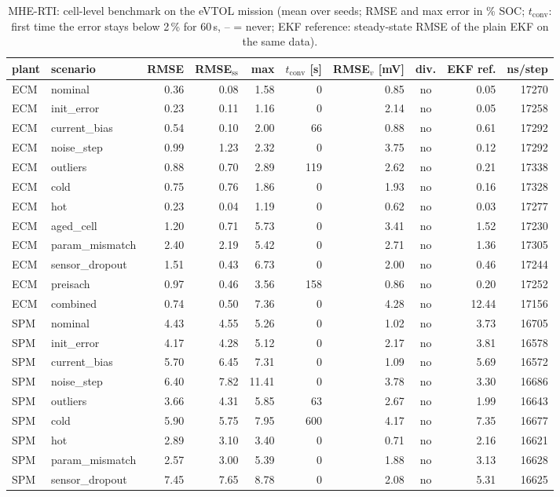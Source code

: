 \begin{table}[H]\centering\footnotesize\setlength{\tabcolsep}{4pt}
\caption{MHE-RTI: cell-level benchmark on the eVTOL mission (mean over seeds; RMSE and max error in \% SOC; $t_\mathrm{conv}$: first time the error stays below 2\,\% for 60\,s, -- = never; EKF reference: steady-state RMSE of the plain EKF on the same data).}\label{tab:cell_MHERTI}
\begin{tabular}{llrrrrrcrr}\toprule
plant & scenario & RMSE & RMSE$_\mathrm{ss}$ & max & $t_\mathrm{conv}$ [s] & RMSE$_v$ [mV] & div. & EKF ref. & ns/step \\ \midrule
ECM & nominal & 0.36 & 0.08 & 1.58 & 0 & 0.85 & no & 0.05 & 17270 \\
ECM & init\_error & 0.23 & 0.11 & 1.16 & 0 & 2.14 & no & 0.05 & 17258 \\
ECM & current\_bias & 0.54 & 0.10 & 2.00 & 66 & 0.88 & no & 0.61 & 17292 \\
ECM & noise\_step & 0.99 & 1.23 & 2.32 & 0 & 3.75 & no & 0.12 & 17292 \\
ECM & outliers & 0.88 & 0.70 & 2.89 & 119 & 2.62 & no & 0.21 & 17338 \\
ECM & cold & 0.75 & 0.76 & 1.86 & 0 & 1.93 & no & 0.16 & 17328 \\
ECM & hot & 0.23 & 0.04 & 1.19 & 0 & 0.62 & no & 0.03 & 17277 \\
ECM & aged\_cell & 1.20 & 0.71 & 5.73 & 0 & 3.41 & no & 1.52 & 17230 \\
ECM & param\_mismatch & 2.40 & 2.19 & 5.42 & 0 & 2.71 & no & 1.36 & 17305 \\
ECM & sensor\_dropout & 1.51 & 0.43 & 6.73 & 0 & 2.00 & no & 0.46 & 17244 \\
ECM & preisach & 0.97 & 0.46 & 3.56 & 158 & 0.86 & no & 0.20 & 17252 \\
ECM & combined & 0.74 & 0.50 & 7.36 & 0 & 4.28 & no & 12.44 & 17156 \\
\midrule
SPM & nominal & 4.43 & 4.55 & 5.26 & 0 & 1.02 & no & 3.73 & 16705 \\
SPM & init\_error & 4.17 & 4.28 & 5.12 & 0 & 2.17 & no & 3.81 & 16578 \\
SPM & current\_bias & 5.70 & 6.45 & 7.31 & 0 & 1.09 & no & 5.69 & 16572 \\
SPM & noise\_step & 6.40 & 7.82 & 11.41 & 0 & 3.78 & no & 3.30 & 16686 \\
SPM & outliers & 3.66 & 4.31 & 5.85 & 63 & 2.67 & no & 1.99 & 16643 \\
SPM & cold & 5.90 & 5.75 & 7.95 & 600 & 4.17 & no & 7.35 & 16677 \\
SPM & hot & 2.89 & 3.10 & 3.40 & 0 & 0.71 & no & 2.16 & 16621 \\
SPM & param\_mismatch & 2.57 & 3.00 & 5.39 & 0 & 1.88 & no & 3.13 & 16628 \\
SPM & sensor\_dropout & 7.45 & 7.65 & 8.78 & 0 & 2.08 & no & 5.31 & 16625 \\
\bottomrule\end{tabular}\end{table}
